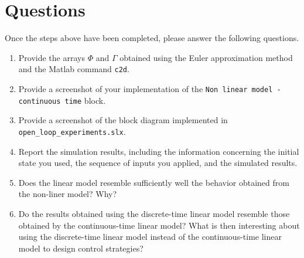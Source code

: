\section{Questions}
Once the steps above have been completed, please answer the following questions. 
	\begin{enumerate}
		\setlength\itemsep{0em}
		\item Provide the arrays $\Phi$ and $\Gamma$ obtained using the Euler approximation method and the Matlab command \texttt{c2d}.
		\item Provide a screenshot of your implementation of the \texttt{Non linear model - continuous time} block.
		\item Provide a screenshot of the block diagram implemented in \texttt{open\_loop\_experiments.slx}.
		\item Report the simulation results, including the information concerning the initial state you used, the sequence of inputs you applied, and the simulated results. 
		\item Does the linear model resemble sufficiently well the behavior obtained from the non-liner model? Why?
		\item Do the results obtained using the discrete-time linear model resemble those obtained by the continuous-time linear model?
		What is then interesting about using the discrete-time linear model instead of the continuous-time linear model to design control strategies?  
	\end{enumerate}

